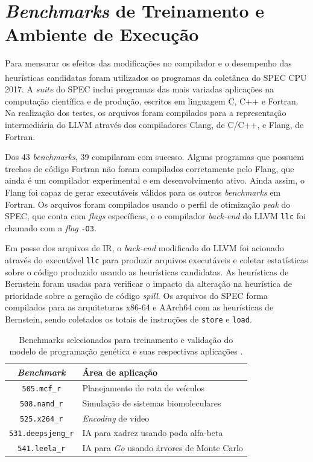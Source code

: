 \documentclass[
	12pt,				%
	openright,			%
	twoside,			%
	a4paper,			%
	tcc,			%
	]{ABNT-DC-UEL}
\begin{document}
\section{\textit{Benchmarks} de Treinamento e Ambiente de Execução}

Para mensurar os efeitos das modificações no compilador e o desempenho das heurísticas candidatas foram utilizados os programas da coletânea do SPEC CPU\textsuperscript{\textregistered} 2017. A \textit{suite} do SPEC inclui programas das mais variadas aplicações na computação científica e de produção, escritos em linguagem C, C++ e Fortran. Na realização dos testes, os arquivos foram compilados para a representação intermediária do LLVM através dos compiladores Clang, de C/C++, e Flang, de Fortran.

Dos 43 \textit{benchmarks}, 39 compilaram com sucesso. Alguns programas que possuem trechos de código Fortran não foram compilados corretamente pelo Flang, que ainda é um compilador experimental e em desenvolvimento ativo. Ainda assim, o Flang foi capaz de gerar executáveis válidos para os outros \textit{benchmarks} em Fortran. Os arquivos foram compilados usando o perfil de otimização \textit{peak} do SPEC, que conta com \textit{flags} específicas, e o compilador \textit{back-end} do LLVM \texttt{llc} foi chamado com a \textit{flag} \texttt{-O3}. 

Em posse dos arquivos de IR, o \textit{back-end} modificado do LLVM foi acionado através do executável \texttt{llc} para produzir arquivos executáveis e coletar estatísticas sobre o código produzido usando as heurísticas candidatas. As heurísticas de Bernstein \cite{bernstein:89} foram usadas para verificar o impacto da alteração na heurística de prioridade sobre a geração de código \textit{spill}. Os arquivos do SPEC forma compilados para as arquiteturas x86-64 e AArch64 com as heurísticas de Bernstein, sendo coletados os totais de instruções de \texttt{store} e \texttt{load}.

\begin{table}[htb]
    \centering
    \begin{tabular}{cl}
        \hline
        \textbf{\textit{Benchmark}} & \textbf{Área de aplicação} \\
        \hline %
        \texttt{505.mcf\_r} & Planejamento de rota de veículos \\
        \texttt{508.namd\_r} & Simulação de sistemas biomoleculares \\
        \texttt{525.x264\_r} & \textit{Encoding} de vídeo \\
        \texttt{531.deepsjeng\_r} & IA para xadrez usando poda alfa-beta \\
        \texttt{541.leela\_r} & IA para \textit{Go} usando árvores de Monte Carlo \\
        \hline
    \end{tabular}
    \caption{Benchmarks selecionados para treinamento e validação do modelo de programação genética e suas respectivas aplicações \cite{speccpu:01}.}
    \label{tab:benchmarks}
\end{table}
\end{document}
